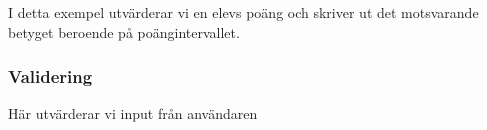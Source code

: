 \hypertarget{cb1}{}
\begin{Shaded}
\begin{Highlighting}[]
\OperatorTok{=} \OperatorTok{;}
 \OperatorTok{(}\OperatorTok{\textgreater{}=} \OperatorTok{)} \OperatorTok{\{}
    \OperatorTok{(}\OperatorTok{);}
\OperatorTok{\}}   \OperatorTok{(}\OperatorTok{\textgreater{}=} \OperatorTok{)} \OperatorTok{\{}
    \OperatorTok{(}\OperatorTok{);}
\OperatorTok{\}}   \OperatorTok{(}\OperatorTok{\textgreater{}=} \OperatorTok{)} \OperatorTok{\{}
    \OperatorTok{(}\OperatorTok{);}
\OperatorTok{\}}   \OperatorTok{(}\OperatorTok{\textgreater{}=} \OperatorTok{)} \OperatorTok{\{}
    \OperatorTok{(}\OperatorTok{);}
\OperatorTok{\}}  \OperatorTok{\{}
    \OperatorTok{(}\OperatorTok{);}
\OperatorTok{\}}
\end{Highlighting}
\end{Shaded}

I detta exempel utvärderar vi en elevs poäng och skriver ut det
motsvarande betyget beroende på poängintervallet.

\hypertarget{validering}{%
\subsubsection{Validering}\label{validering}}

Här utvärderar vi input från användaren

